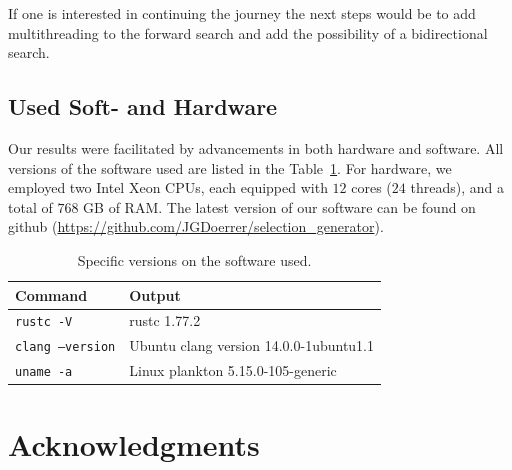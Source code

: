 \documentclass[twoside,leqno,twocolumn]{article}
\begin{document}
If one is interested in continuing the journey the next steps would be to add
multithreading to the forward search and add the possibility of a bidirectional
search.


\subsection{Used Soft- and Hardware} \label{sec:hardware}

Our results were facilitated by advancements in both hardware and software.
All versions of the software used are listed in the Table~\ref{table:command_outputs}.
For hardware, we employed two Intel Xeon CPUs, each equipped with $12$ cores ($24$ threads), and a total of $768$ GB of RAM.
The latest version of our software can be found on github (\url{https://github.com/JGDoerrer/selection_generator}).

\begin{table}[!t]
  \renewcommand{\arraystretch}{1.2}
  \caption{Specific versions on the software used.}
  \label{table:command_outputs}
  \centering
  \begin{tabular}{l|l}
    \textbf{Command}         & \textbf{Output}                        \\ \hline
    \texttt{rustc -V}        & rustc 1.77.2                           \\ \hline
    \texttt{clang --version} & Ubuntu clang version 14.0.0-1ubuntu1.1 \\ \hline
    \texttt{uname -a}        & Linux plankton 5.15.0-105-generic      \\
  \end{tabular}
\end{table}

\section*{Acknowledgments}


\end{document}
